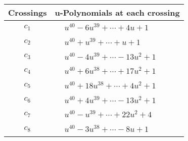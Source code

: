 \documentclass[1p]{elsarticle_modified}
\theoremstyle{definition}
\begin{document}
\begin{tabular}{m{50pt}|m{274pt}}
Crossings & \hspace{64pt}u-Polynomials at each crossing \\
\hline $$\begin{aligned}c_{1}\end{aligned}$$&$\begin{aligned}
&u^{40}-6 u^{39}+\cdots+4 u+1
\end{aligned}$\\
\hline $$\begin{aligned}c_{2}\end{aligned}$$&$\begin{aligned}
&u^{40}+u^{39}+\cdots+u+1
\end{aligned}$\\
\hline $$\begin{aligned}c_{3}\end{aligned}$$&$\begin{aligned}
&u^{40}-4 u^{39}+\cdots-13 u^2+1
\end{aligned}$\\
\hline $$\begin{aligned}c_{4}\end{aligned}$$&$\begin{aligned}
&u^{40}+6 u^{38}+\cdots+17 u^2+1
\end{aligned}$\\
\hline $$\begin{aligned}c_{5}\end{aligned}$$&$\begin{aligned}
&u^{40}+18 u^{38}+\cdots+4 u^2+1
\end{aligned}$\\
\hline $$\begin{aligned}c_{6}\end{aligned}$$&$\begin{aligned}
&u^{40}+4 u^{39}+\cdots-13 u^2+1
\end{aligned}$\\
\hline $$\begin{aligned}c_{7}\end{aligned}$$&$\begin{aligned}
&u^{40}- u^{39}+\cdots+22 u^2+4
\end{aligned}$\\
\hline $$\begin{aligned}c_{8}\end{aligned}$$&$\begin{aligned}
&u^{40}-3 u^{38}+\cdots-8 u+1
\end{aligned}$\\

\end{tabular}
\end{document}
